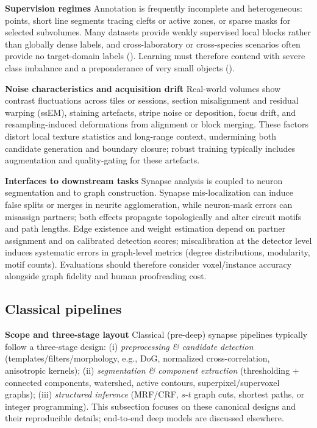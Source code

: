 \medskip
\noindent\textbf{Supervision regimes}\;
Annotation is frequently incomplete and heterogeneous: points, short line segments tracing clefts or active zones, or sparse masks for selected subvolumes.
Many datasets provide weakly supervised local blocks rather than globally dense labels, and cross-laboratory or cross-species scenarios often provide no target-domain labels (\cite{Park2022Cerebellar}).
Learning must therefore contend with severe class imbalance and a preponderance of very small objects (\cite{Svara2022Zebrafish}).\par

\medskip
\noindent\textbf{Noise characteristics and acquisition drift}\;
Real-world volumes show contrast fluctuations across tiles or sessions, section misalignment and residual warping (ssEM), staining artefacts, stripe noise or deposition, focus drift, and resampling-induced deformations from alignment or block merging.
These factors distort local texture statistics and long-range context, undermining both candidate generation and boundary closure; robust training typically includes augmentation and quality-gating for these artefacts.\par

\medskip
\noindent\textbf{Interfaces to downstream tasks}\;
Synapse analysis is coupled to neuron segmentation and to graph construction.
Synapse mis-localization can induce false splits or merges in neurite agglomeration, while neuron-mask errors can misassign partners; both effects propagate topologically and alter circuit motifs and path lengths.
Edge existence and weight estimation depend on partner assignment and on calibrated detection scores; miscalibration at the detector level induces systematic errors in graph-level metrics (degree distributions, modularity, motif counts).
Evaluations should therefore consider voxel/instance accuracy alongside graph fidelity and human proofreading cost.\par

\medskip

\subsection{Classical pipelines}

\noindent\textbf{Scope and three-stage layout}\;
Classical (pre-deep) synapse pipelines typically follow a three-stage design:
(i) \emph{preprocessing \& candidate detection} (templates/filters/morphology, e.g., DoG, normalized cross-correlation, anisotropic kernels);
(ii) \emph{segmentation \& component extraction} (thresholding \(+\) connected components, watershed, active contours, superpixel/supervoxel graphs);
(iii) \emph{structured inference} (MRF/CRF, \(s\)-\(t\) graph cuts, shortest paths, or integer programming).
This subsection focuses on these canonical designs and their reproducible details; end-to-end deep models are discussed elsewhere.

